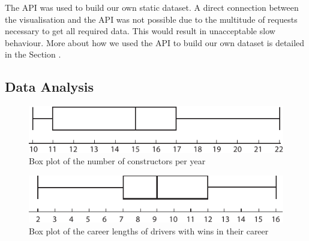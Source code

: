 \documentclass{sigchi}
\begin{document}
The API was used to build our own static dataset. A direct connection between the visualisation and the API was not possible due to the multitude of requests necessary to get all required data. This would result in unacceptable slow behaviour. More about how we used the API to build our own dataset is detailed in the Section . 

\subsection{Data Analysis} 

\begin{figure}[ht]
\centering
\includegraphics[width=0.8\columnwidth]{images/constructorsboxplot.pdf}
\caption{Box plot of the number of constructors per year}
\label{fig:constructorsboxplot}
\end{figure}

\begin{figure}[ht]
\centering
\includegraphics[width=0.8\columnwidth]{images/winsboxplot.pdf}
\caption{Box plot of the career lengths of drivers with wins in their career}
\label{fig:winsboxplot}
\end{figure}
\end{document}
